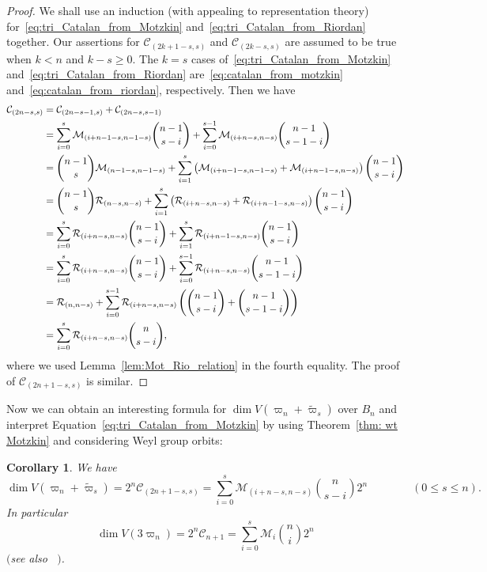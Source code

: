 \documentclass[11pt, leqno]{amsart}
\theoremstyle{plain}
\newtheorem{corollary}[theorem]{Corollary}
\theoremstyle{definition}
\numberwithin{equation}{section}
\newcommand{\fw}{\varpi} %
\newcommand{\tfw}{\widetilde{\fw}} %
\newcommand{\Cat}{\mathcal{C}} %
\newcommand{\Mot}{\mathcal{M}} %
\newcommand{\Rior}{\mathcal{R}} %
\begin{document}
\begin{proof}
We shall use an induction (with appealing to representation theory) for~\eqref{eq:tri_Catalan_from_Motzkin}
and~\eqref{eq:tri_Catalan_from_Riordan} together.
Our assertions for $\Cat_{(2k+1-s,s)}$ and $\Cat_{(2k-s,s)}$ are assumed to be true when $k<n$ and $k-s \ge 0$. The $k=s$ cases of~\eqref{eq:tri_Catalan_from_Motzkin}
and~\eqref{eq:tri_Catalan_from_Riordan} are~\eqref{eq:catalan_from_motzkin} and~\eqref{eq:catalan_from_riordan}, respectively.
Then we have
\begin{align*}
\Cat_{(2n-s,s)} & = \Cat_{(2n-s-1,s)} + \Cat_{(2n-s,s-1)} \allowdisplaybreaks  \\
&= \sum_{i=0}^s \Mot_{(i+n-1-s,n-1-s)}\binom{n-1}{s-i}+ \sum_{i=0}^{s-1} \Mot_{(i+n-s,n-s)}\binom{n-1}{s-1-i} \allowdisplaybreaks  \\
&= \binom{n-1}{s}\Mot_{(n-1-s,n-1-s)}+\sum_{i=1}^{s} \left(\Mot_{(i+n-1-s,n-1-s)}+\Mot_{(i+n-1-s,n-s)}\right)\binom{n-1}{s-i}\allowdisplaybreaks  \\
&= \binom{n-1}{s}\Rior_{(n-s,n-s)}+\sum_{i=1}^{s} \left(\Rior_{(i+n-s,n-s)}+\Rior_{(i+n-1-s,n-s)}\right)\binom{n-1}{s-i} \allowdisplaybreaks  \\
&= \sum_{i=0}^s \Rior_{(i+n-s,n-s)}\binom{n-1}{s-i} + \sum_{i=1}^s \Rior_{(i+n-1-s,n-s)}\binom{n-1}{s-i} \allowdisplaybreaks  \\
&= \sum_{i=0}^s \Rior_{(i+n-s,n-s)}\binom{n-1}{s-i} + \sum_{i=0}^{s-1} \Rior_{(i+n-s,n-s)}\binom{n-1}{s-1-i} \allowdisplaybreaks  \\
& = \Rior_{(n,n-s)}+\sum_{i=0}^{s-1} \Rior_{(i+n-s,n-s)}\left(\binom{n-1}{s-i} +\binom{n-1}{s-1-i} \right) \allowdisplaybreaks  \\
& = \sum_{i=0}^s \Rior_{(i+n-s,n-s)}\binom{n}{s-i},
\end{align*}
where we used Lemma~\ref{lem:Mot_Rio_relation} in the fourth equality.
The proof of $\Cat_{(2n+1-s,s)}$ is similar.
\end{proof}

Now we can obtain an interesting formula for $\dim V(\fw_n + \tfw_s)$ over $B_n$ and interpret Equation~\eqref{eq:tri_Catalan_from_Motzkin} by using Theorem~\ref{thm: wt Motzkin}
and considering Weyl group orbits:

\begin{corollary} We have
\[
\dim V(\fw_n + \tfw_s) = 2^n \Cat_{(2n+1-s,s)} = \sum_{i=0}^s \Mot_{(i+n-s,n-s)}\binom{n}{s-i}2^n
\qquad\qquad (0 \le s \le n).
\]
In particular
\[
\dim V(3\fw_n) = 2^n \Cat_{n+1} = \sum_{i=0}^s \Mot_{i}\binom{n}{i}2^n
\]
$($see also ~\cite[A003645]{OEIS}$)$.
\end{corollary}
\end{document}
